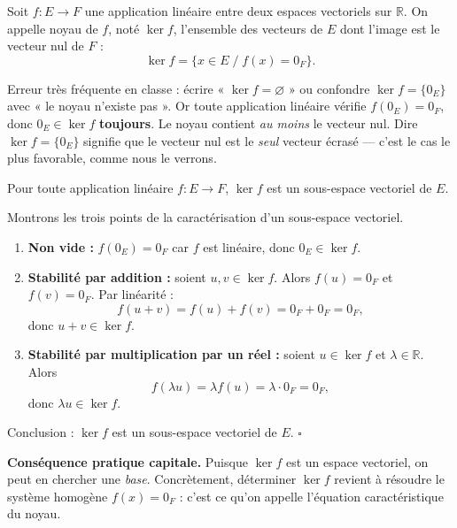 \documentclass[11pt]{article}
\newcommand{\cle}[1]{{\popxbold\color{popdark}#1}}
\begin{document}
\begin{definition}
Soit $f : E \to F$ une application linéaire entre deux espaces vectoriels sur $\mathbb{R}$. On appelle \cle{noyau} de $f$, noté $\ker f$, l'ensemble des vecteurs de $E$ dont l'image est le vecteur nul de $F$ :
\[ \ker f = \{ x \in E \;/\; f(x) = 0_F \}. \]
\end{definition}

\begin{attention}
Erreur très fréquente en classe : écrire « $\ker f = \varnothing$ » ou confondre $\ker f = \{0_E\}$ avec « le noyau n'existe pas ». Or toute application linéaire vérifie $f(0_E) = 0_F$, donc $0_E \in \ker f$ \textbf{toujours}. Le noyau contient \emph{au moins} le vecteur nul. Dire $\ker f = \{0_E\}$ signifie que le vecteur nul est le \emph{seul} vecteur écrasé — c'est le cas le plus favorable, comme nous le verrons.
\end{attention}

\begin{propriete}
Pour toute application linéaire $f : E \to F$, $\ker f$ est un \cle{sous-espace vectoriel} de $E$.
\end{propriete}

\begin{experience}
Montrons les trois points de la caractérisation d'un sous-espace vectoriel.
\begin{enumerate}
\item \textbf{Non vide :} $f(0_E) = 0_F$ car $f$ est linéaire, donc $0_E \in \ker f$.
\item \textbf{Stabilité par addition :} soient $u, v \in \ker f$. Alors $f(u) = 0_F$ et $f(v) = 0_F$. Par linéarité :
\[ f(u+v) = f(u) + f(v) = 0_F + 0_F = 0_F, \]
donc $u + v \in \ker f$.
\item \textbf{Stabilité par multiplication par un réel :} soient $u \in \ker f$ et $\lambda \in \mathbb{R}$. Alors
\[ f(\lambda u) = \lambda f(u) = \lambda \cdot 0_F = 0_F, \]
donc $\lambda u \in \ker f$.
\end{enumerate}
Conclusion : $\ker f$ est un sous-espace vectoriel de $E$. $\square$
\end{experience}

\textbf{Conséquence pratique capitale.} Puisque $\ker f$ est un espace vectoriel, on peut en chercher une \emph{base}. Concrètement, déterminer $\ker f$ revient à résoudre le système homogène $f(x) = 0_F$ : c'est ce qu'on appelle l'\cle{équation caractéristique} du noyau.
\end{document}
